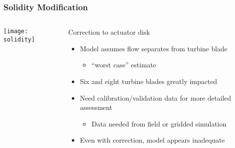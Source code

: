\documentclass[mathserif]{beamer}
\begin{document}
%
%
\begin{frame}
 \frametitle{Solidity Modification}


 \begin{columns}[]
  \begin{column}{0.5\linewidth}


   \begin{center}
    \texttt{[image: solidity]}
   \end{center}

  \end{column}
  \begin{column}{0.5\linewidth}
   
   \begin{block}{Correction to actuator disk}
    \begin{itemize}
     \item Model assumes flow separates from turbine blade
	   \begin{itemize}
	    \item ``worst case'' estimate
	   \end{itemize}
     \item Six and eight turbine blades greatly impacted
     \item Need calibration/validation data for more detailed assessment  
	   \begin{itemize}
	    \item Data needed from field or gridded simulation
	   \end{itemize}
     \item Even with correction, model appears inadequate
    \end{itemize}

   \end{block}
  \end{column}
 \end{columns}

\end{frame}



%
%
\end{document}
